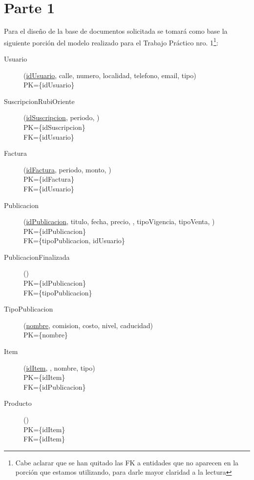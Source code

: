 \section{Parte 1}
Para el dise\~no de la base de documentos solicitada se tomar\'a como base la siguiente porci\'on del modelo realizado para el Trabajo Pr\'actico nro. 1\footnote{Cabe aclarar que se han quitado las FK a entidades que no aparecen en la porci\'on que estamos utilizando, para darle mayor claridad a la lectura}:

\begin{description}
\item[Usuario](\underline{idUsuario}, calle, numero, localidad, telefono, email, tipo)\\
PK=\{idUsuario\}

 \item[SuscripcionRubiOriente](\underline{idSuscripcion}, periodo, )\\
PK=\{idSuscripcion\}\\
FK=\{idUsuario\}

 \item[Factura](\underline{idFactura}, periodo, monto, )\\
PK=\{idFactura\}\\
FK=\{idUsuario\}

\item[Publicacion](\underline{idPublicacion}, titulo, fecha, precio, , tipoVigencia, tipoVenta, )\\
PK=\{idPublicacion\}\\
FK=\{tipoPublicacion, idUsuario\}

 \item[PublicacionFinalizada](\underline{})\\
PK=\{idPublicacion\}\\
FK=\{tipoPublicacion\}

 \item[TipoPublicacion](\underline{nombre}, comision, costo, nivel, caducidad)\\
PK=\{nombre\}

 \item[Item](\underline{idItem}, , nombre, tipo)\\
PK=\{idItem\}\\
FK=\{idPublicacion\}

 \item[Producto](\underline{})\\
PK=\{idItem\}\\
FK=\{idItem\}


\end{description}
